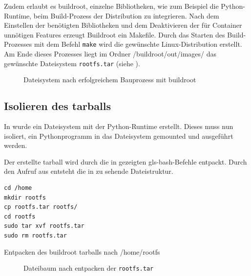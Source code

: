 Zudem erlaubt es buildroot, einzelne Bibliotheken, wie zum Beispiel die Python-Runtime, beim Build-Prozess der Distribution zu integrieren. Nach dem Einstellen der benötigten Bibliotheken und dem Deaktivieren der für Container unnötigen Features erzeugt Buildroot ein Makefile. Durch das Starten des Build-Prozesses mit dem Befehl \texttt{make} wird die gewünschte Linux-Distribution erstellt. Am Ende dieses Prozesses liegt im Ordner /buildroot/out/images/ das gewünschte Dateisystem \texttt{rootfs.tar} (siehe ).

\begin{figure}[h]
		\centering
		\begin{minipage}{0.9\textwidth}
		\end{minipage}
		\caption{Dateisystem nach erfolgreichem Bauprozess mit buildroot}
		\label{fig:dirtreeNachBuildroot}
\end{figure} 


\subsection{Isolieren des tarballs}
\label{sec:isolieren}
In  wurde ein Dateisystem mit der Python-Runtime erstellt. Dieses muss nun isoliert, ein Pythonprogramm in das Dateisystem gemounted und ausgeführt werden.

Der erstellte tarball wird durch die in  gezeigten \gls{gls-bash}-Befehle entpackt. Durch den Aufruf aus  entsteht die in  zu sehende Dateistruktur.

\begin{listing}[h]
	\begin{verbatim}
cd /home
mkdir rootfs
cp rootfs.tar rootfs/
cd rootfs
sudo tar xvf rootfs.tar
sudo rm rootfs.tar
	\end{verbatim}
	\caption{Entpacken des buildroot tarballs nach /home/rootfs}
	\label{lst:untarRootfs}
\end{listing}


\begin{figure}[h]
	\centering
	\begin{minipage}{0.9\textwidth}
	\end{minipage}
	\caption{Dateibaum nach entpacken der \texttt{rootfs.tar}}
	\label{fig:baumNachUntar}
\end{figure}

